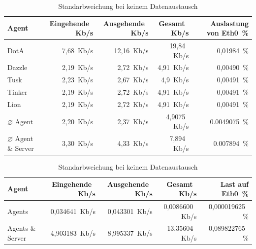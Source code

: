


\begin{table}
\centering
\begin{tabular}{l%
 r<{\,Kb/s}%
 r<{\,Kb/s}%
 r<{\,Kb/s}%
 r<{\,\%}%
}
Agent	  			& Eingehende		& Ausgehende		& Gesamt		& Auslastung von Eth0	\\
\hline
DotA				& 7,68			& 12,16			& 19,84			& 0,01984 		\\
Dazzle 				& 2,19	 		& 2,72			& 4,91			& 0,00490 		\\
Tusk 				& 2,23			& 2,67			& 4,9			& 0,00491		\\
Tinker				& 2,19	 		& 2,72	 		& 4,91	 		& 0,00491		\\
Lion				& 2,19	 		& 2,72	 		& 4,91  		& 0,00491		\\
$\diameter $ Agent 		& 2,20			& 2,37			& 4,9075		& 0.0049075		\\   
$\diameter $ Agent \& Server 	& 3,30  		& 4,33			& 7,894			& 0.007894		\\
\end{tabular}
\caption{Traffic bei keinem Datenaustausch auf den Pis}
\label{tab:noTraffic}
\begin{tabular}{l%
 r<{\,Kb/s}%
 r<{\,Kb/s}%
 r<{\,Kb/s}%
 r<{\,\%}%
}
Agent		& Eingehende            & Ausgehende            & Gesamt                & Last auf Eth0 \\
\hline
Agents		& 0,034641              & 0,043301              & 0,0086600             & 0,000019625  \\
Agents \& Server& 4,903183 		& 8,995337        	& 13,35604            	& 0,089822765        \\
\end{tabular}
\caption{Standarbweichung bei keinem Datenaustausch}
\label{tab:NoTrafficAbweichung}
\end{table}


